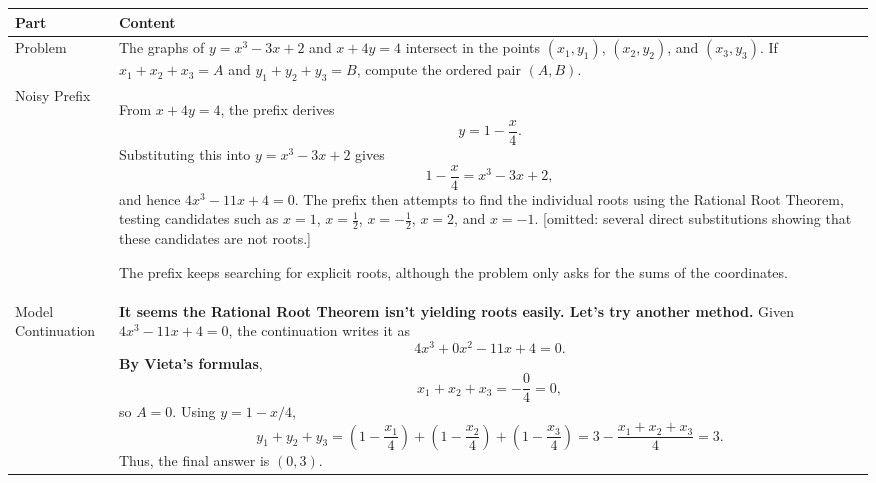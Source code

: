 \begin{minipage}{\TableWidth}
\small
\begin{tabularx}{\linewidth}{@{}L{1.25in}Y@{}}
\toprule
Part & Content \\
\midrule
Problem & The graphs of \(y=x^3-3x+2\) and \(x+4y=4\) intersect in the points \((x_1,y_1)\), \((x_2,y_2)\), and \((x_3,y_3)\). If \(x_1+x_2+x_3=A\) and \(y_1+y_2+y_3=B\), compute the ordered pair \((A,B)\). \\
\addlinespace
Noisy Prefix & From \(x+4y=4\), the prefix derives
\[
y=1-\frac{x}{4}.
\]
Substituting this into \(y=x^3-3x+2\) gives
\[
1-\frac{x}{4}=x^3-3x+2,
\]
and hence \(4x^3-11x+4=0\). The prefix then \textcolor{DenoiseRed}{attempts to find the individual roots using the Rational Root Theorem, testing candidates such as \(x=1\), \(x=\tfrac12\), \(x=-\tfrac12\), \(x=2\), and \(x=-1\)}. [omitted: several direct substitutions showing that these candidates are not roots.]

\textcolor{DenoiseRed}{The prefix keeps searching for explicit roots, although the problem only asks for the sums of the coordinates.} \\
\addlinespace
Model Continuation & \textbf{It seems the Rational Root Theorem isn't yielding roots easily. Let's try another method.} Given \(4x^3-11x+4=0\), the continuation writes it as
\[
4x^3+0x^2-11x+4=0.
\]
\textbf{By Vieta's formulas},
\[
x_1+x_2+x_3=-\frac{0}{4}=0,
\]
so \(A=0\). Using \(y=1-x/4\),
\[
y_1+y_2+y_3
=\left(1-\frac{x_1}{4}\right)+\left(1-\frac{x_2}{4}\right)+\left(1-\frac{x_3}{4}\right)
=3-\frac{x_1+x_2+x_3}{4}=3.
\]
Thus, the final answer is \(\boxed{(0,3)}\). \\
\bottomrule
\end{tabularx}
\end{minipage}
